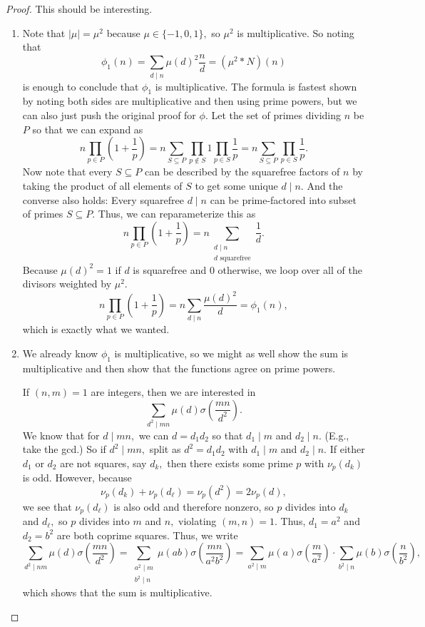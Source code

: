 \begin{proof}
This should be interesting.
\begin{enumerate}[label=(\alph*)]
    \item Note that $|\mu|=\mu^2$ because $\mu\in\{-1,0,1\},$ so $\mu^2$ is multiplicative. So noting that
    \[\phi_1(n)=\sum_{d\mid n}\mu(d)^2\frac nd=\left(\mu^2*N\right)(n)\]
    is enough to conclude that $\phi_1$ is multiplicative. The formula is fastest shown by noting both sides are multiplicative and then using prime powers, but we can also just push the original proof for $\phi.$ Let the set of primes dividing $n$ be $P$ so that we can expand as
    \[n\prod_{p\in P}\left(1+\frac1p\right)=n\sum_{S\subseteq P}\prod_{p\not\in S}1\prod_{p\in S}\frac1p=n\sum_{S\subseteq P}\prod_{p\in S}\frac1p.\]
    Now note that every $S\subseteq P$ can be described by the squarefree factors of $n$ by taking the product of all elements of $S$ to get some unique $d\mid n.$ And the converse also holds: Every squarefree $d\mid n$ can be prime-factored into subset of primes $S\subseteq P.$ Thus, we can reparameterize this as
    \[n\prod_{p\in P}\left(1+\frac1p\right)=n\sum_{\substack{d\mid n\\d\text{ squarefree}}}\frac1d.\]
    Because $\mu(d)^2=1$ if $d$ is squarefree and 0 otherwise, we loop over all of the divisors weighted by $\mu^2.$
    \[n\prod_{p\in P}\left(1+\frac1p\right)=n\sum_{d\mid n}\frac{\mu(d)^2}d=\phi_1(n),\]
    which is exactly what we wanted.
    \item We already know $\phi_1$ is multiplicative, so we might as well show the sum is multiplicative and then show that the functions agree on prime powers.
    
    If $(n,m)=1$ are integers, then we are interested in
    \[\sum_{d^2\mid mn}\mu(d)\sigma\left(\frac{mn}{d^2}\right).\]
    We know that for $d\mid mn,$ we can $d=d_1d_2$ so that $d_1\mid m$ and $d_2\mid n.$ (E.g., take the gcd.) So if $d^2\mid mn,$ split as $d^2=d_1d_2$ with $d_1\mid m$ and $d_2\mid n.$ If either $d_1$ or $d_2$ are not squares, say $d_k,$ then there exists some prime $p$ with $\nu_p(d_k)$ is odd. However, because
    \[\nu_p(d_k)+\nu_p(d_\ell)=\nu_p\left(d^2\right)=2\nu_p(d),\]
    we see that $\nu_p(d_\ell)$ is also odd and therefore nonzero, so $p$ divides into $d_k$ and $d_\ell,$ so $p$ divides into $m$ and $n,$ violating $(m,n)=1.$ Thus, $d_1=a^2$ and $d_2=b^2$ are both coprime squares. Thus, we write
    \[\sum_{d^2\mid nm}\mu(d)\sigma\left(\frac{mn}{d^2}\right)=\sum_{\substack{a^2\mid m\\b^2\mid n}}\mu(ab)\sigma\left(\frac{mn}{a^2b^2}\right)=\sum_{a^2\mid m}\mu(a)\sigma\left(\frac m{a^2}\right)\cdot\sum_{b^2\mid n}\mu(b)\sigma\left(\frac n{b^2}\right),\]
    which shows that the sum is multiplicative.
    

\end{enumerate}
\end{proof}
